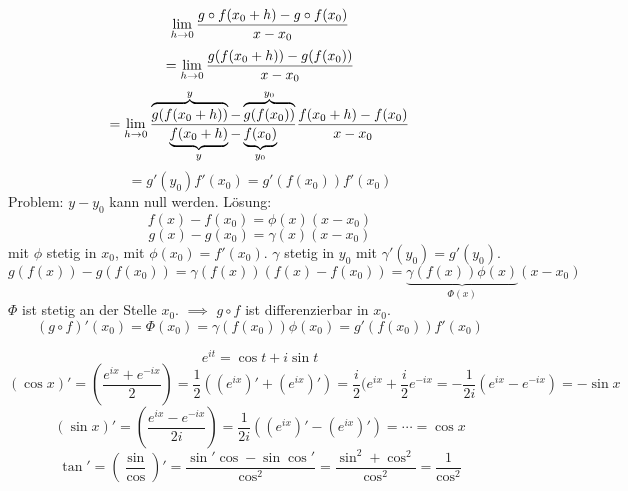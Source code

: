 \begin{Bew}
  \[\displaystyle\lim_{h\rightarrow0}\frac{g\circ f(x_0+h)-g\circ f(x_0)}{x-x_0}\]
  \[=\displaystyle\lim_{h\rightarrow0}\frac{g(f(x_0+h))-g(f(x_0))}{x-x_0}\]
  \[=\displaystyle\lim_{h\rightarrow0}\frac{\overbrace{g(f(x_0+h))}^y-\overbrace{g(f(x_0))}^{y_0}}{\underbrace{f(x_0+h)}_y-\underbrace{f(x_0)}_{y_0}}\frac{f(x_0+h)-f(x_0)}{x-x_0}\]
  \[=g'(y_0)f'(x_0)=g'(f(x_0))f'(x_0)\]
  Problem: $y-y_0$ kann null werden. Lösung:
  \[f(x)-f(x_0)=\phi(x)(x-x_0)\]
  \[g(x)-g(x_0)=\gamma(x)(x-x_0)\]
  mit $\phi$ stetig in $x_0$, mit $\phi(x_0)=f'(x_0)$. $\gamma$ stetig in $y_0$ mit $\gamma'(y_0)=g'(y_0)$.
  \[g(f(x))-g(f(x_0))=\gamma(f(x))(f(x)-f(x_0))=\underbrace{\gamma(f(x))\phi(x)}_{\Phi(x)}(x-x_0)\]
  $\Phi$ ist stetig an der Stelle $x_0$. $\implies$ $g\circ f$ ist differenzierbar in $x_0$.
  \[(g\circ f)'(x_0)=\Phi(x_0)=\gamma(f(x_0))\phi(x_0)=g'(f(x_0))f'(x_0)\]
\end{Bew}
\begin{Bsp}
  \[e^{it}=\cos t+i\sin t\]
  \[(\cos x)'=\left(\frac{e^{ix}+e^{-ix}}{2}\right)=\frac{1}{2}\left( (e^{ix})'+(e^{ix})' \right)=\frac{i}{2}(e^{ix}+\frac{i}{2}e^{-ix}=-\frac{1}{2i}(e^{ix}-e^{-ix})=-\sin x\]
  \[(\sin x)'=\left(\frac{e^{ix}-e^{-ix}}{2i}\right)=\frac{1}{2i}\left( (e^{ix})'-(e^{ix})' \right)=\cdots=\cos x\]
  \[\tan'=\left( \frac{\sin}{\cos} \right)'=\frac{\sin'\cos-\sin\cos'}{\cos^2}=\frac{\sin^2+\cos^2}{\cos^2}=\frac{1}{\cos^2}\]
\end{Bsp}

